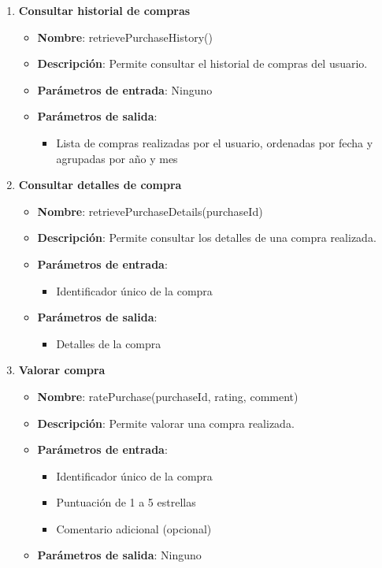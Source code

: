 \begin{enumerate}[label=SOP-\protect\twodigits{\arabic*}:, align=left, leftmargin=*]
\item \textbf{Consultar historial de compras}
\begin{itemize}
\item \textbf{Nombre}: retrievePurchaseHistory()
\item \textbf{Descripción}: Permite consultar el historial de compras del usuario.
\item \textbf{Parámetros de entrada}: Ninguno
\item \textbf{Parámetros de salida}:
\begin{itemize}
\item Lista de compras realizadas por el usuario, ordenadas por fecha y agrupadas por año y mes
\end{itemize}
\end{itemize}

\item \textbf{Consultar detalles de compra}
\begin{itemize}
\item \textbf{Nombre}: retrievePurchaseDetails(purchaseId)
\item \textbf{Descripción}: Permite consultar los detalles de una compra realizada.
\item \textbf{Parámetros de entrada}:
\begin{itemize}
\item Identificador único de la compra
\end{itemize}
\item \textbf{Parámetros de salida}:
\begin{itemize}
\item Detalles de la compra
\end{itemize}
\end{itemize}

\item \textbf{Valorar compra}
\begin{itemize}
\item \textbf{Nombre}: ratePurchase(purchaseId, rating, comment)
\item \textbf{Descripción}: Permite valorar una compra realizada.
\item \textbf{Parámetros de entrada}:
\begin{itemize}
\item Identificador único de la compra
\item Puntuación de 1 a 5 estrellas
\item Comentario adicional (opcional)
\end{itemize}
\item \textbf{Parámetros de salida}: Ninguno
\end{itemize}


\end{enumerate}
